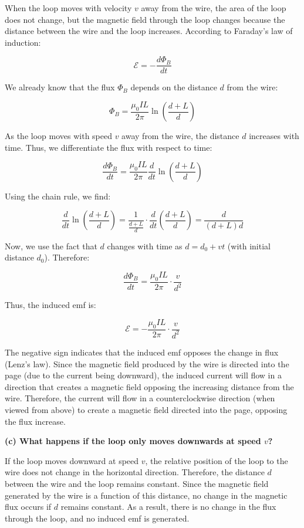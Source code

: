 \documentclass{article}
\begin{document}
When the loop moves with velocity $v$ away from the wire, the area of the loop does not change, but the magnetic field through the loop changes because the distance between the wire and the loop increases. According to Faraday’s law of induction:

\[
\mathcal{E} = - \frac{d\Phi_B}{dt}
\]

We already know that the flux $\Phi_B$ depends on the distance $d$ from the wire:

\[
\Phi_B = \frac{\mu_0 I L}{2 \pi} \ln\left( \frac{d + L}{d} \right)
\]

As the loop moves with speed $v$ away from the wire, the distance $d$ increases with time. Thus, we differentiate the flux with respect to time:

\[
\frac{d\Phi_B}{dt} = \frac{\mu_0 I L}{2 \pi} \frac{d}{dt} \ln\left( \frac{d + L}{d} \right)
\]

Using the chain rule, we find:

\[
\frac{d}{dt} \ln\left( \frac{d + L}{d} \right) = \frac{1}{\frac{d + L}{d}} \cdot \frac{d}{dt} \left( \frac{d + L}{d} \right) = \frac{d}{(d + L)d}
\]

Now, we use the fact that $d$ changes with time as $d = d_0 + vt$ (with initial distance $d_0$). Therefore:

\[
\frac{d\Phi_B}{dt} = \frac{\mu_0 I L}{2 \pi} \cdot \frac{v}{d^2}
\]

Thus, the induced emf is:

\[
\mathcal{E} = - \frac{\mu_0 I L}{2 \pi} \cdot \frac{v}{d^2}
\]

The negative sign indicates that the induced emf opposes the change in flux (Lenz’s law). Since the magnetic field produced by the wire is directed into the page (due to the current being downward), the induced current will flow in a direction that creates a magnetic field opposing the increasing distance from the wire. Therefore, the current will flow in a counterclockwise direction (when viewed from above) to create a magnetic field directed into the page, opposing the flux increase.

\textbf{(c) What happens if the loop only moves downwards at speed $v$?}

If the loop moves downward at speed $v$, the relative position of the loop to the wire does not change in the horizontal direction. Therefore, the distance $d$ between the wire and the loop remains constant. Since the magnetic field generated by the wire is a function of this distance, no change in the magnetic flux occurs if $d$ remains constant. As a result, there is no change in the flux through the loop, and no induced emf is generated. 
\end{document}

